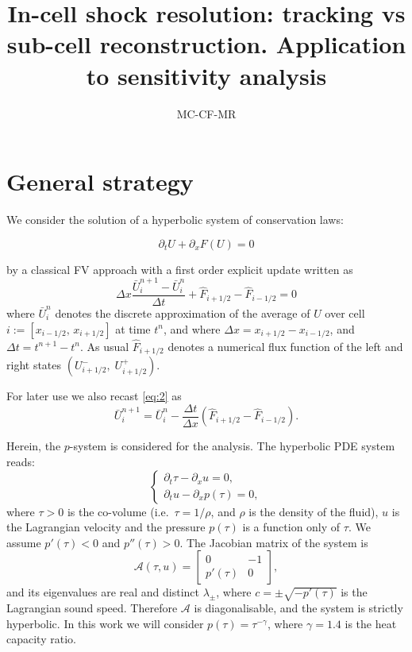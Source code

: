 \documentclass[10pt]{article}
\title{In-cell shock resolution: tracking vs sub-cell reconstruction. Application to sensitivity analysis}
\author{MC-CF-MR}
\begin{document}
\maketitle
\tableofcontents


\section{General strategy}

We consider the solution of a hyperbolic system of conservation laws: 

\begin{equation}\label{eq:1}
\partial_tU+ \partial_x F(U) =0
\end{equation}

by a classical FV approach with a first order explicit update written as
\begin{equation}\label{eq:2}
\Delta x\dfrac{\bar U^{n+1}_i-\bar U^{n}_i}{\Delta t}+ \hat F_{i+1/2}  -  \hat F_{i-1/2} =0
\end{equation}
where   $\bar U_i^n$ denotes  the discrete approximation of the average of $U$ over cell $i:=[x_{i-1/2},\,x_{i+1/2}]$ at time $t^n$,
and where $\Delta x =x_{i+1/2}-x_{i-1/2}$, and $\Delta t=t^{n+1}-t^n$.
As usual $\hat F_{i+1/2} $ denotes a numerical flux function of the left and right states $(U_{i+1/2}^-,\;U_{i+1/2}^+)$.

For later use we also recast  \eqref{eq:2} as
\begin{equation}\label{eq:3}
\bar U^{n+1}_i = \bar U^{n}_i - \dfrac{\Delta t}{\Delta x}\left(\hat F_{i+1/2}  -  \hat F_{i-1/2}\right).
\end{equation}
 
Herein, the $p$-system is considered for the analysis.
The hyperbolic PDE system reads:
\begin{equation} 
\begin{cases}
\partial_t \tau - \partial_x u = 0,\\
\partial_t u - \partial_x p(\tau) = 0,
\end{cases} 
\end{equation}
where $\tau>0$ is the co-volume (i.e.\ $\tau=1/\rho$, and $\rho$ is the density of the fluid), $u$ is the 
Lagrangian velocity and the pressure $p(\tau)$ is a function only of $\tau$. 
We assume $p'(\tau)<0$ and $p''(\tau)>0$.
The Jacobian matrix of the system is
\begin{equation}
\mathcal{A}(\tau,u) = \begin{bmatrix} 0 & -1 \\ p'(\tau) & 0 \end{bmatrix}, 
\end{equation}
and its eigenvalues are real and distinct $\lambda_{\pm}$, where $c=\pm\sqrt{-p'(\tau)}$ is the Lagrangian sound speed. 
Therefore $\mathcal{A}$ is diagonalisable, and the system is strictly hyperbolic. 
In this work we will consider $p(\tau) = \tau^{-\gamma}$, where $\gamma = 1.4$ is the heat capacity ratio.
\end{document}
